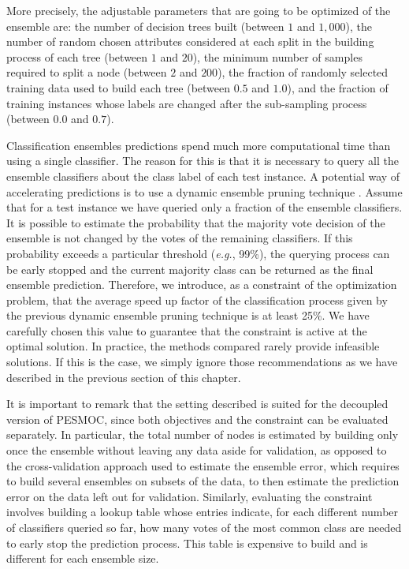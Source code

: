 More precisely, the adjustable parameters that are going to be optimized of the ensemble are: the number of decision trees built
(between $1$ and $1,000$), the number of random chosen attributes considered at each split in the building
process of each tree (between $1$ and $20$), the minimum number of samples required to split a node (between $2$ and
$200$), the fraction of randomly selected training data used to build each tree (between $0.5$ and $1.0$),
and the fraction of training instances whose labels are changed after the sub-sampling process (between $0.0$ and $0.7$).

Classification ensembles predictions spend much more computational time than using a single classifier. 
The reason for this is that it is necessary to query all the ensemble classifiers about the class
label of each test instance. A potential way of accelerating predictions is to use a dynamic ensemble pruning
technique \citep{hernandez2009statistical}. Assume that for a test instance we have queried only
a fraction of the ensemble classifiers. It is possible to estimate the probability that
the majority vote decision of the ensemble is not changed by the votes of the remaining classifiers. If
this probability exceeds a particular threshold (\emph{e.g.}, 99\%), the querying process can be early stopped
and the current majority class can be returned as the final ensemble prediction. Therefore, we introduce, as
a constraint of the optimization problem, that the average speed up factor of the classification process
given by the previous dynamic ensemble pruning technique is at least 25\%.
We have carefully chosen this value to guarantee that the constraint is active at the optimal solution.
In practice, the methods compared rarely provide infeasible solutions. If this is the case, we simply ignore those recommendations
as we have described in the previous section of this chapter.

It is important to remark that the setting described is suited for the decoupled version of PESMOC, since both objectives
and the constraint can be evaluated separately. In particular, the total number of nodes is estimated
by building only once the ensemble without leaving any data aside for validation, as opposed to the
cross-validation approach used to estimate the ensemble error, which requires to build several
ensembles on subsets of the data, to then estimate the prediction error on the data left out for
validation. Similarly, evaluating the constraint involves building a lookup table whose entries indicate, for
each different number of classifiers queried so far, how many votes of the most common class are needed to
early stop the prediction process. This table is expensive to build and is different for each ensemble size.

